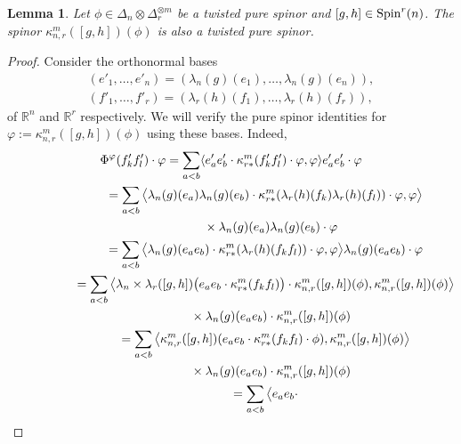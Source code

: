 \documentclass[10pt,a4paper]{amsart}
\numberwithin{equation}{section}
\newtheorem{Lemma}[Theorem]{Lemma}
\begin{document}
\begin{Lemma}\label{lemma: orbit of pure spinor} Let $\phi\in\Delta_n\otimes\Delta_r^{\otimes m}$ be a twisted pure spinor and $[g,h]\in {\rm Spin}^{r}(n)$. The spinor $\kappa_{n,r}^m([g,h])(\phi)$ is also a twisted pure spinor.
\end{Lemma}
\begin{proof} Consider the orthonormal bases
\begin{gather*}
(e'_1,\dots,e'_n)=(\lambda_n(g)(e_1),\dots,\lambda_n(g)(e_n)),\\
(f'_1,\dots,f'_r)=(\lambda_r(h)(f_1),\dots,\lambda_r(h)(f_r)),
\end{gather*}
of $\mathbb{R}^n$ and $\mathbb{R}^r$ respectively.
We will verify the pure spinor identities for $\varphi:=\kappa_{n,r}^m([g,h])(\phi)$ using these bases.
Indeed,{\samepage
\begin{gather*}
 \Phi^\varphi(f'_kf'_l) \cdot \varphi = \sum_{a<b} \langle e'_ae'_b\cdot \kappa_{r*}^m(f'_kf'_l)\cdot \varphi,\varphi\rangle e'_ae'_b\cdot\varphi\\
 \hphantom{\Phi^\varphi(f'_kf'_l) \cdot \varphi}{} = \sum_{a<b} \big\langle \lambda_n(g)(e_a)\lambda_n(g)(e_b)\cdot
\kappa_{r*}^m(\lambda_r(h)(f_k)\lambda_r(h)(f_l))\cdot \varphi,\varphi\big\rangle\\
\hphantom{\Phi^\varphi(f'_kf'_l) \cdot \varphi=}{}\times \lambda_n(g)(e_a)\lambda_n(g)(e_b)\cdot\varphi\\
\hphantom{\Phi^\varphi(f'_kf'_l) \cdot \varphi}{}
 = \sum_{a<b} \big\langle \lambda_n(g)(e_ae_b)\cdot
\kappa_{r*}^m(\lambda_r(h)(f_kf_l))\cdot \varphi,\varphi\big\rangle
\lambda_n(g)(e_ae_b)\cdot\varphi\\
\hphantom{\Phi^\varphi(f'_kf'_l) \cdot \varphi}{}
 = \sum_{a<b} \big\langle \lambda_n\times\lambda_r([g,h])\big(e_ae_b\cdot
\kappa_{r*}^m(f_kf_l)\big)\cdot \kappa_{n,r}^m([g,h])(\phi),\kappa_{n,r}^m([g,h])(\phi)\big\rangle\\
\hphantom{\Phi^\varphi(f'_kf'_l) \cdot \varphi=}{}\times
\lambda_n(g)(e_ae_b)\cdot\kappa_{n,r}^m([g,h])(\phi)\\
\hphantom{\Phi^\varphi(f'_kf'_l) \cdot \varphi}{}
 = \sum_{a<b} \big\langle \kappa_{n,r}^m([g,h])(e_ae_b\cdot
\kappa_{r*}^m(f_kf_l)\cdot \phi),\kappa_{n,r}^m([g,h])(\phi)\big\rangle\\
\hphantom{\Phi^\varphi(f'_kf'_l) \cdot \varphi=}{}\times
\lambda_n(g)(e_ae_b)\cdot\kappa_{n,r}^m([g,h])(\phi)\\
 \hphantom{\Phi^\varphi(f'_kf'_l) \cdot \varphi}{}
 = \sum_{a<b} \big\langle e_ae_b\cdot

\end{gather*}}
\end{proof}
\end{document}
